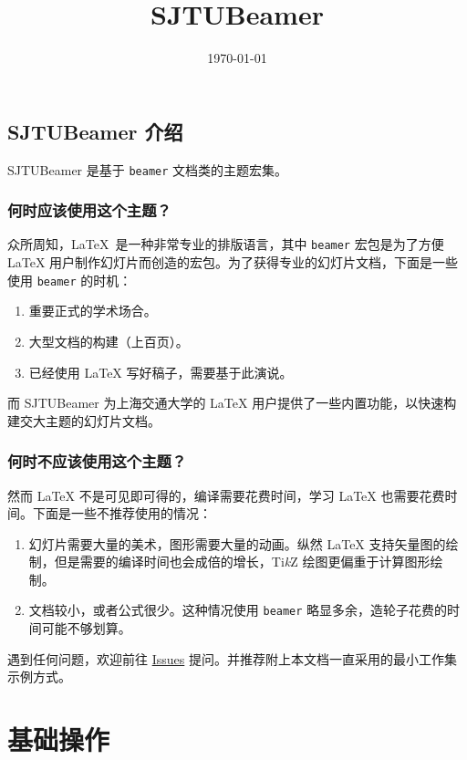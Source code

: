 \documentclass[
    UTF8,
    heading=true,
    12pt,
    a4paper
]{ctexrep}
\newcommand{\cls}[1]{\texttt{#1}}
\def\themename{\textsf{SJTUBeamer}}
\begin{document}
\title{\themename}
\date{\today}

\chapter*{\themename{} 介绍}

\themename{} 是基于 \cls{beamer} 文档类的主题宏集。

\section*{何时应该使用这个主题？}
众所周知，\LaTeX\ 是一种非常专业的排版语言，其中 \cls{beamer} 宏包是为了方便 \LaTeX{} 用户制作幻灯片而创造的宏包。为了获得专业的幻灯片文档，下面是一些使用 \cls{beamer} 的时机：
\begin{enumerate}
  \item 重要正式的学术场合。
  \item 大型文档的构建（上百页）。
  \item 已经使用 \LaTeX{} 写好稿子，需要基于此演说。
\end{enumerate}

而 \themename{} 为上海交通大学的 \LaTeX{} 用户提供了一些内置功能，以快速构建交大主题的幻灯片文档。

\section*{何时不应该使用这个主题？}
然而 \LaTeX{} 不是可见即可得的，编译需要花费时间，学习 \LaTeX{} 也需要花费时间。下面是一些不推荐使用的情况：
\begin{enumerate}
  \item 幻灯片需要大量的美术，图形需要大量的动画。纵然 \LaTeX{} 支持矢量图的绘制，但是需要的编译时间也会成倍的增长，Ti\emph{k}Z 绘图更偏重于计算图形绘制。
  \item 文档较小，或者公式很少。这种情况使用 \cls{beamer} 略显多余，造轮子花费的时间可能不够划算。
\end{enumerate}

遇到任何问题，欢迎前往 \href{https://github.com/sjtug/SJTUBeamer/issues}{Issues} 提问。并推荐附上本文档一直采用的最小工作集示例方式。

\setcounter{tocdepth}{0}
\tableofcontents

\part{基础操作}
\end{document}
